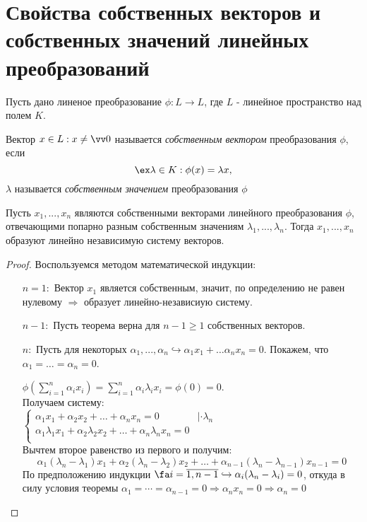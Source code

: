 \section{Свойства собственных векторов и собственных значений линейных преобразований}
  Пусть дано линеное преобразование $\phi: L \rightarrow L$, где $L$ - линейное пространство над полем $K$.
  \begin{defn}
  Вектор $x \in L: x \neq \vv 0$ называется \textit{собственным вектором} преобразования $\phi$, если 
  \begin{equation}
    \ex \lambda \in K: \phi(x)=\lambda x,
  \end{equation}
$\lambda$ называется \textit{собственным значением} преобразования $\phi$ 
  \end{defn}
  \begin{thm}
  Пусть $x_1,...,x_n$ являются собственными векторами линейного преобразования $\phi$, отвечающими попарно разным собственным значениям $\lambda_1,...,\lambda_n$. Тогда $x_1,...,x_n$ образуют линейно независимую систему векторов.
  \end{thm}
  \begin{proof}
  Воспользуемся методом математической индукции:
  \linebreak\vspace*{-\baselineskip}
  \begin{itemize}
  \item[\underline{$n=1:$}] Вектор $x_1$ является собственным, значит, по определению не равен нулевому $\Rightarrow$ образует линейно-независиую систему.
  \item[\underline{$n-1:$}] Пусть теорема верна для $n-1\ge 1$ собственных векторов.
  
  \item[\underline{$n:$}] Пусть для некоторых $\alpha_1,...,\alpha_n \hookrightarrow \alpha_1 x_1 + \ldots \alpha_n x_n = 0$. Покажем, что $\alpha_1=\ldots=\alpha_n=0$.
  
  $\phi(\sum_{i=1}^n \alpha_i x_i)=\sum_{i=1}^n \alpha_i \lambda_i x_i = \phi(0)=0$. \\
  Получаем систему: \\
  $\begin{cases}
    \alpha_1 x_1 + \alpha_2 x_2 + \ldots + \alpha_n x_n = 0 & |\cdot \lambda_n \\
    \alpha_1 \lambda_1 x_1 + \alpha_2 \lambda_2 x_2 + \ldots + \alpha_n \lambda_n x_n = 0 \\
  \end{cases}$ \\
  Вычтем второе равенство из первого и получим:
  \begin{equation*}
  \alpha_1 (\lambda_n-\lambda_1) x_1 + \alpha_2 (\lambda_n-\lambda_2) x_2 + \ldots + \alpha_{n-1} (\lambda_n-\lambda_{n-1}) x_{n-1} = 0
  \end{equation*}
  По предположению индукции $\fa i=\overline{1,n-1} \hookrightarrow \alpha_i(\lambda_n-\lambda_i)=0$, откуда в силу условия теоремы $\alpha_1=\cdots=\alpha_{n-1}=0 \Rightarrow \alpha_n x_n=0 \Rightarrow \alpha_n=0$
  \end{itemize}
  \vspace{-1.65\baselineskip}
  \end{proof}
